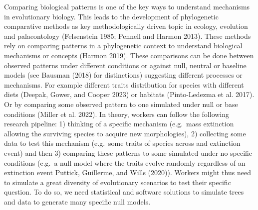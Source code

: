 \documentclass[
]{article}
\begin{document}
Comparing biological patterns is one of the key ways to understand
mechanisms in evolutionary biology. This leads to the development of
phylogenetic comparative methods as key methodologically driven topic in
ecology, evolution and palaeontology (Felsenstein 1985; Pennell and
Harmon 2013). These methods rely on comparing patterns in a phylogenetic
context to understand biological mechanisms or concepts (Harmon 2019).
These comparisons can be done between observed patterns under different
conditions or against null, neutral or baseline models (see Bausman
(2018) for distinctions) suggesting different processes or mechanisms.
For example different traits distribution for species with different
diets (Deepak, Gower, and Cooper 2023) or habitats (Pinto-Ledezma et al.
2017). Or by comparing some observed pattern to one simulated under null
or base conditions (Miller et al. 2022). In theory, workers can follow
the following research pipeline: 1) thinking of a specific mechanism
(e.g.~mass extinction allowing the surviving species to acquire new
morphologies), 2) collecting some data to test this mechanism (e.g.~some
traits of species across and extinction event) and then 3) comparing
these patterns to some simulated under no specific conditions (e.g.~a
null model where the traits evolve randomly regardless of an extinction
event Puttick, Guillerme, and Wills (2020)). Workers might thus need to
simulate a great diversity of evolutionary scenarios to test their
specific question. To do so, we need statistical and software solutions
to simulate trees and data to generate many specific null models.
\end{document}
